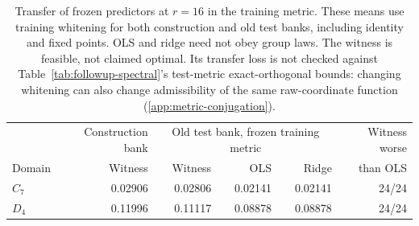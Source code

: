 \begin{table}[t]
\centering\small
\begin{tabular}{@{}lrrrrr@{}}
\toprule
& Construction bank & \multicolumn{3}{c}{Old test bank, frozen training metric} & Witness worse \\
Domain & Witness & Witness & OLS & Ridge & than OLS \\
\midrule
$C_7$ & 0.02906 & 0.02806 & 0.02141 & 0.02141 & 24/24 \\
$D_4$ & 0.11996 & 0.11117 & 0.08878 & 0.08878 & 24/24 \\
\bottomrule
\end{tabular}
\caption{Transfer of frozen predictors at $r=16$ in the training metric. These means use training whitening for both construction and old test banks, including identity and fixed points. OLS and ridge need not obey group laws. The witness is feasible, not claimed optimal. Its transfer loss is not checked against Table~\ref{tab:followup-spectral}'s test-metric exact-orthogonal bounds: changing whitening can also change admissibility of the same raw-coordinate function (\cref{app:metric-conjugation}).}
\label{tab:followup-witness}
\end{table}
